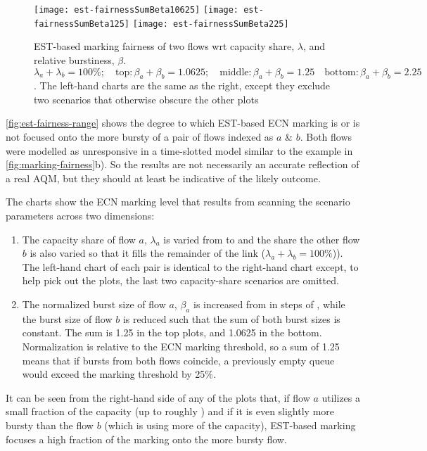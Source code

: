 \begin{figure*}[t!]
	\centering
	\texttt{[image: est-fairnessSumBeta10625]}
	\texttt{[image: est-fairnessSumBeta125]}
	\texttt{[image: est-fairnessSumBeta225]}
	\caption{EST-based marking fairness of two flows wrt capacity share, \(\lambda\), and relative burstiness, \(\beta\).\\
	\(\lambda_a+\lambda_b=100\%; \quad\mathrm{top:} \beta_a+\beta_b=1.0625; \quad\mathrm{middle:} \beta_a+\beta_b=1.25 
	\quad\mathrm{bottom:} \beta_a+\beta_b=2.25\). 
	The left-hand charts are the same as the right, except they exclude two scenarios that otherwise obscure the other plots}\label{fig:est-fairness-range}
\end{figure*}

\autoref{fig:est-fairness-range} shows the degree to which EST-based ECN marking is or is not focused onto the more bursty of a pair of flows indexed as \(a\) \& \(b\). Both flows were modelled as unresponsive in a time-slotted model similar to the example in \autoref{fig:marking-fairness}b). So the results are not necessarily an accurate reflection of a real AQM, but they should at least be indicative of the likely outcome.

The charts show the ECN marking level that results from scanning the scenario parameters across two dimensions:
\begin{enumerate}
	\item The capacity share of flow \(a\), \(\lambda_a\) is varied from  to  and the share the other flow \(b\) is also varied so that it fills the remainder of the link (\(\lambda_a+\lambda_b=100\%\))). The left-hand chart of each pair is identical to the right-hand chart except, to help pick out the plots, the last two capacity-share scenarios are omitted.
	\item The normalized burst size of flow \(a\), \(\beta_a\) is increased from  in steps of , while the burst size of flow \(b\) is reduced such that the sum of both burst sizes is constant. The sum is 1.25 in the top plots, and 1.0625 in the bottom. 	Normalization is relative to the ECN marking threshold, so a sum of 1.25 means that if bursts from both flows coincide, a previously empty queue would exceed the marking threshold by 25\%.
\end{enumerate}

It can be seen from the right-hand side of any of the plots that, if flow \(a\) utilizes a small fraction of the capacity (up to roughly ) and if it is even slightly more bursty than the flow \(b\) (which is using more of the capacity), EST-based marking focuses a high fraction of the marking onto the more bursty flow. 

